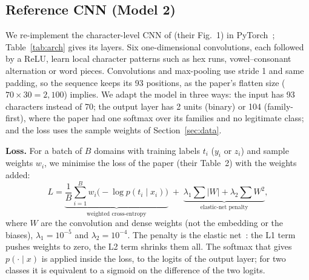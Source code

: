 \documentclass[11pt]{article}
\begin{document}
\subsection{Reference CNN (Model 2)}\label{sec:cnn}
We re-implement the character-level CNN of \citet{gregorio2024incremental} (their
Fig.~1) in PyTorch~\cite{paszke2019pytorch}; Table~\ref{tab:arch} gives its layers.
Six one-dimensional convolutions, each followed by a ReLU, learn local character
patterns such as hex runs, vowel--consonant alternation or word pieces.
Convolutions and max-pooling use stride 1 and same padding, so the sequence keeps
its 93 positions, as the paper's flatten size ($70 \times 30 = 2{,}100$) implies.
We adapt the model in three ways: the input has 93 characters instead of 70; the
output layer has 2 units (binary) or 104 (family-first), where the paper had one
softmax over its families and no legitimate class; and the loss uses the sample
weights of Section~\ref{sec:data}.

\textbf{Loss.} For a batch of $B$ domains with training labels $t_i$ ($y_i$ or
$z_i$) and sample weights $w_i$, we minimise the loss of the paper (their
Table~2) with the weights added:
\begin{equation}
L = \underbrace{\frac{1}{B}\sum_{i=1}^{B} w_i \big(-\log p(t_i \mid x_i)\big)}_{\text{weighted cross-entropy}}
\;+\; \underbrace{\lambda_1 \sum |W| + \lambda_2 \sum W^2}_{\text{elastic-net penalty}},
\label{eq:loss}
\end{equation}
where $W$ are the convolution and dense weights (not the embedding or the biases),
$\lambda_1 = 10^{-5}$ and $\lambda_2 = 10^{-4}$. The penalty is the elastic
net~\cite{zou2005elasticnet}: the L1 term pushes weights to zero, the L2 term
shrinks them all. The softmax that gives $p(\cdot \mid x)$ is applied inside the
loss, to the logits of the output layer; for two classes it is equivalent to a
sigmoid on the difference of the two logits.
\end{document}
